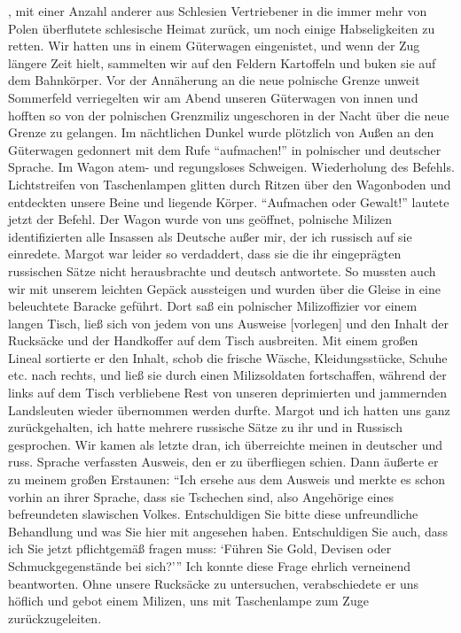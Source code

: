 \documentclass[a5paper,pagesize,10pt,twoside=true]{scrbook}
\renewcommand{\marginpar}[2][]{}
\begin{document}
{}, mit einer Anzahl anderer aus Schlesien Vertriebener in die immer mehr von Polen überflutete schlesische Heimat zurück, um noch einige Habseligkeiten zu retten. Wir hatten uns in einem Güterwagen eingenistet, und wenn der Zug längere Zeit hielt, sammelten wir auf den Feldern Kartoffeln und buken sie auf dem Bahnkörper. Vor der Annäherung an die neue polnische Grenze unweit Sommerfeld verriegelten wir \marginpar{108} am Abend unseren Güterwagen von innen und hofften so von der polnischen Grenzmiliz ungeschoren in der Nacht über die neue Grenze zu gelangen. Im nächtlichen Dunkel wurde plötzlich von Außen an den Güterwagen gedonnert mit dem Rufe \enquote{aufmachen!} in polnischer und deutscher Sprache. Im Wagon atem- und regungsloses Schweigen. Wiederholung des Befehls. Lichtstreifen von Taschenlampen glitten durch Ritzen über den Wagonboden und entdeckten unsere Beine und liegende Körper. \enquote{Aufmachen oder Gewalt!} lautete jetzt der Befehl. Der Wagon wurde von uns geöffnet, polnische Milizen identifizierten alle Insassen als Deutsche außer mir, der ich russisch auf sie einredete. Margot war leider so verdaddert, dass sie die ihr eingeprägten russischen Sätze nicht herausbrachte und deutsch antwortete. So mussten auch wir mit unserem leichten Gepäck aussteigen und wurden über die Gleise in eine beleuchtete Baracke geführt. Dort saß ein polnischer Milizoffizier vor einem langen Tisch, ließ sich von jedem von uns Ausweise [vorlegen] und den Inhalt der Rucksäcke und der Handkoffer auf dem Tisch ausbreiten. Mit einem großen Lineal sortierte er den Inhalt, schob die frische Wäsche, Kleidungsstücke, Schuhe etc. nach rechts, und ließ sie durch einen Milizsoldaten fortschaffen, \marginpar{109} während der links auf dem Tisch verbliebene Rest von unseren deprimierten und jammernden Landsleuten wieder übernommen werden durfte. Margot und ich hatten uns ganz zurückgehalten, ich hatte mehrere russische Sätze zu ihr und in Russisch gesprochen. Wir kamen als letzte dran, ich überreichte meinen in deutscher und russ. Sprache verfassten Ausweis, den er zu überfliegen schien. Dann äußerte er zu meinem großen Erstaunen: \enquote{Ich ersehe aus dem Ausweis und merkte es schon vorhin an ihrer Sprache, dass sie Tschechen sind, also Angehörige eines befreundeten slawischen Volkes. Entschuldigen Sie bitte diese unfreundliche Behandlung und was Sie hier mit angesehen haben. Entschuldigen Sie auch, dass ich Sie jetzt pflichtgemäß fragen muss: \enquote{Führen Sie Gold, Devisen oder Schmuckgegenstände bei sich?}} Ich konnte diese Frage ehrlich verneinend beantworten. Ohne unsere Rucksäcke zu untersuchen, verabschiedete er uns höflich und gebot einem Milizen, uns mit Taschenlampe zum Zuge zurückzugeleiten.
\end{document}
